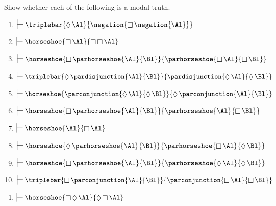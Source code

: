 Show whether each of the following is a modal truth. 
\begin{multicols}{2}
\begin{enumerate}
\item $\sststile{}{}\triplebar{\DIAMOND\Al}{\negation{\BOX\negation{\Al}}}$
\item $\sststile{}{}\horseshoe{\BOX\Al}{\BOX\BOX\Al}$
\item $\sststile{}{}\horseshoe{\BOX\parhorseshoe{\Al}{\Bl}}{\parhorseshoe{\BOX\Al}{\BOX\Bl}}$
\item $\sststile{}{}\triplebar{\DIAMOND\pardisjunction{\Al}{\Bl}}{\pardisjunction{\DIAMOND\Al}{\DIAMOND\Bl}}$
\item $\sststile{}{}\horseshoe{\parconjunction{\DIAMOND\Al}{\DIAMOND\Bl}}{\DIAMOND\parconjunction{\Al}{\Bl}}$
\item $\sststile{}{}\horseshoe{\BOX\parhorseshoe{\Al}{\Bl}}{\parhorseshoe{\Al}{\BOX\Bl}}$
\item $\sststile{}{}\horseshoe{\Al}{\BOX\Al}$
\item $\sststile{}{}\horseshoe{\DIAMOND\parhorseshoe{\Al}{\Bl}}{\parhorseshoe{\BOX\Al}{\DIAMOND\Bl}}$
\item $\sststile{}{}\horseshoe{\BOX\parhorseshoe{\Al}{\Bl}}{\parhorseshoe{\DIAMOND\Al}{\DIAMOND\Bl}}$
\item $\sststile{}{}\triplebar{\BOX\parconjunction{\Al}{\Bl}}{\parconjunction{\BOX\Al}{\BOX\Bl}}$
\end{enumerate}
\end{multicols}
\begin{enumerate}[start=11]
\item $\sststile{}{}\horseshoe{\BOX\DIAMOND\Al}{\DIAMOND\BOX\Al}$
\end{enumerate}

